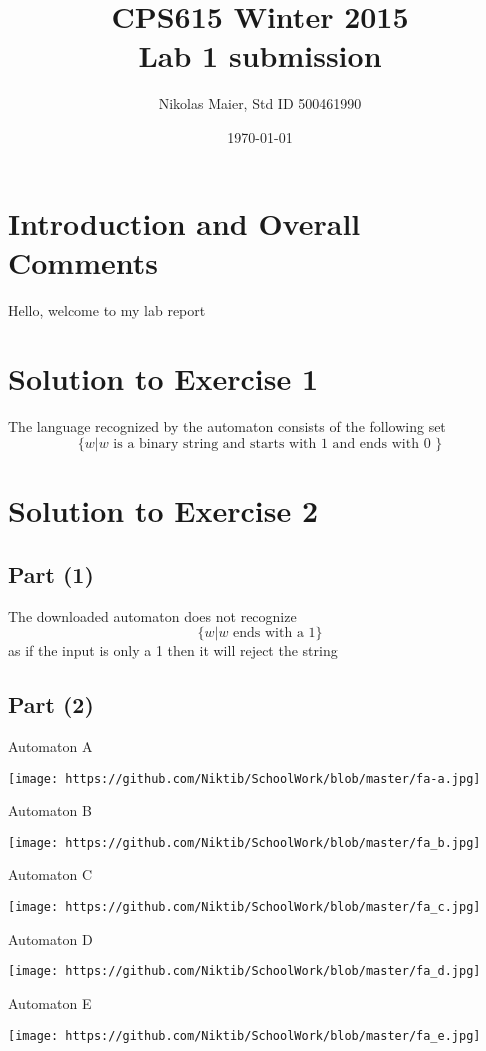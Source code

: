 \documentclass[11pt, fleqn]{article}
\title{CPS615 Winter 2015\\Lab 1 submission}
\author{Nikolas Maier, Std ID 500461990}
\date{\today}
\begin{document}
\maketitle
\section{Introduction and Overall Comments}
Hello, welcome to my lab report 

\section*{Solution to Exercise 1}

The language recognized by the automaton consists of the following set 
\[
\{w|w \mbox{ is a binary string and starts with 1 and ends with 0 }\}
\]

\section*{Solution to Exercise 2}

\subsection*{Part (1)}
The downloaded automaton does not recognize 
\[
\{w|w \mbox{ ends with a 1}\}
\]
as if the input is only a 1 then it will reject the string

\subsection*{Part (2)}
Automaton A 

\texttt{[image: https://github.com/Niktib/SchoolWork/blob/master/fa-a.jpg]}

\pagebreak

Automaton B 

\texttt{[image: https://github.com/Niktib/SchoolWork/blob/master/fa\_b.jpg]}

Automaton C

\texttt{[image: https://github.com/Niktib/SchoolWork/blob/master/fa\_c.jpg]}

Automaton D

\texttt{[image: https://github.com/Niktib/SchoolWork/blob/master/fa\_d.jpg]}

\pagebreak
Automaton E

\texttt{[image: https://github.com/Niktib/SchoolWork/blob/master/fa\_e.jpg]}
\end{document}
